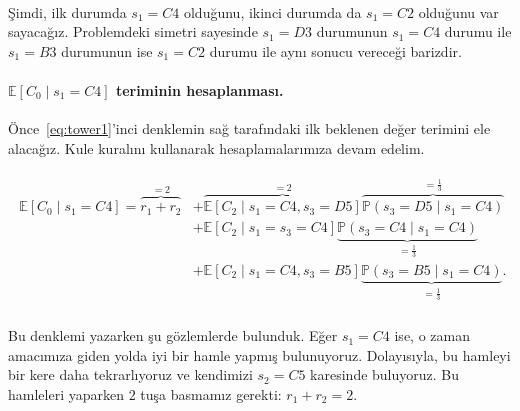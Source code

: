 %
\hphantom{aha} \\[-2ex]
\c{S}imdi, ilk durumda $s_1 = C4$ oldu\u{g}unu, ikinci durumda da $s_1 = C2$
oldu\u{g}unu var sayaca\u{g}{\i}z. Problemdeki simetri sayesinde $s_1 = D3$
durumunun $s_1 = C4$ durumu ile $s_1 = B3$ durumunun ise $s_1 = C2$ durumu ile
ayn{\i} sonucu verece\u{g}i barizdir. 

\vspace{-3mm}
\paragraph{$\mathbb{E}\left[ C_0 \mid s_1 = C4 \right]$ teriminin
hesaplanmas{\i}.} \"{O}nce~\eqref{eq:tower1}'inci denklemin sa\u{g}
taraf{\i}ndaki ilk beklenen de\u{g}er terimini ele alaca\u{g}{\i}z. Kule
kural{\i}n{\i} kullanarak hesaplamalar{\i}m{\i}za devam edelim. 

\vspace{-8mm}
\begin{align}
    \begin{split}
    \mathbb{E}\left[ C_0 \mid s_1 = C4 \right] = \overbrace{r_1 + r_2}^{=2} 
    &+ \overbrace{\mathbb{E}[C_2 \mid s_1 = C4, s_3 = D5]}^{=2} \overbrace{\mathbb{P}(s_3 = D5 \mid s_1 = C4)}^{=\frac{1}{3}} \\
    &+ \mathbb{E}[C_2 \mid s_1 = s_3 = C4] \underbrace{\mathbb{P}(s_3 = C4 \mid s_1 = C4)}_{=\frac{1}{3}} \\
    &+ \mathbb{E}[C_2 \mid s_1 = C4, s_3 = B5] \underbrace{\mathbb{P}(s_3 = B5 \mid s_1 = C4)}_{=\frac{1}{3}}.
    \end{split}
    \label{eq:tower2}
\end{align}
%
\hphantom{aha} \\[-3ex]
Bu denklemi yazarken \c{s}u g\"{o}zlemlerde bulunduk. E\u{g}er $s_1 = C4$ ise, o
zaman amac{\i}m{\i}za giden yolda iyi bir hamle yapm{\i}\c{s} bulunuyoruz.
Dolay{\i}s{\i}yla, bu hamleyi bir kere daha tekrarl{\i}yoruz ve kendimizi $s_2 =
C5$ karesinde buluyoruz. Bu hamleleri yaparken $2$ tu\c{s}a basmam{\i}z gerekti:
$r_1 + r_2 = 2$.

